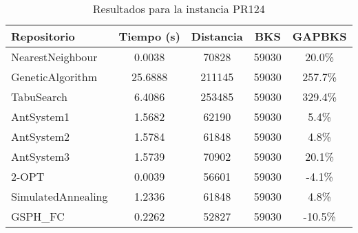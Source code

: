 \begin{table}[H]
\centering
\caption{Resultados para la instancia PR124}
\begin{tabular}{|l|c|c|c|c|}
\hline
\textbf{Repositorio} & \textbf{Tiempo (s)} & \textbf{Distancia} & \textbf{BKS} & \textbf{GAPBKS} \\ 
\hline
NearestNeighbour & 0.0038 & 70828 & 59030 & 20.0\% \\ 
GeneticAlgorithm & 25.6888 & 211145 & 59030 & 257.7\% \\ 
TabuSearch & 6.4086 & 253485 & 59030 & 329.4\% \\ 
AntSystem1 & 1.5682 & 62190 & 59030 & 5.4\% \\ 
AntSystem2 & 1.5784 & 61848 & 59030 & 4.8\% \\ 
AntSystem3 & 1.5739 & 70902 & 59030 & 20.1\% \\ 
2-OPT & 0.0039 & 56601 & 59030 & -4.1\% \\ 
SimulatedAnnealing & 1.2336 & 61848 & 59030 & 4.8\% \\ 
GSPH_FC & 0.2262 & 52827 & 59030 & -10.5\% \\ 
\hline
\end{tabular}
\end{table}
